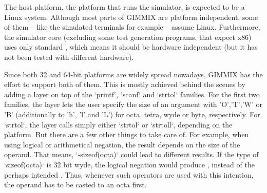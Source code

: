 The host platform, \ie the platform that runs the simulator, is expected to be a Linux system. Although most parts of GIMMIX are platform independent, some of them -- like the simulated terminals for example -- assume Linux. Furthermore, the simulator core (excluding \eg some test generation programs, that expect x86) uses only standard , which means it should be hardware independent (but it has not been tested with different hardware).

Since both 32 and 64-bit platforms are widely spread nowadays, GIMMIX has the effort to support both of them. This is mostly achieved behind the scenes by adding a layer on top of the `printf`, `scanf` and `strtol` families. For the first two families, the layer lets the user specify the size of an argument with 'O','T','W' or 'B' (additionally to 'h', 'l' and 'L') for octa, tetra, wyde or byte, respectively. For `strtol`, the layer calls simply either `strtol` or `strtoll`, depending on the platform. But there are a few other things to take care of. For example, when using logical or arithmetical negation, the result depends on the size of the operand. That means, \eg `-sizeof(octa)` could lead to different results. If the type of `sizeof(octa)` is 32 bit wyde, the logical negation would produce , instead of the perhaps intended . Thus, whenever such operators are used with this intention, the operand has to be casted to an octa first.

